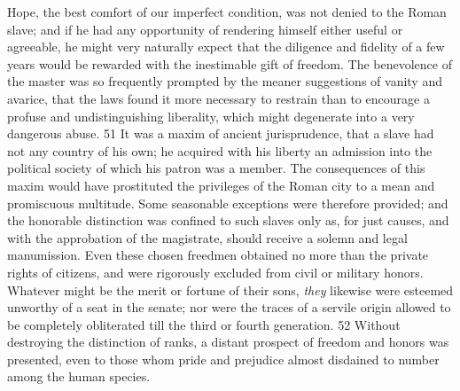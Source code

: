 Hope, the best comfort of our imperfect condition, was not denied
to the Roman slave; and if he had any opportunity of rendering
himself either useful or agreeable, he might very naturally
expect that the diligence and fidelity of a few years would be
rewarded with the inestimable gift of freedom. The benevolence of
the master was so frequently prompted by the meaner suggestions
of vanity and avarice, that the laws found it more necessary to
restrain than to encourage a profuse and undistinguishing
liberality, which might degenerate into a very dangerous abuse.
51 It was a maxim of ancient jurisprudence, that a slave had not
any country of his own; he acquired with his liberty an admission
into the political society of which his patron was a member. The
consequences of this maxim would have prostituted the privileges
of the Roman city to a mean and promiscuous multitude. Some
seasonable exceptions were therefore provided; and the honorable
distinction was confined to such slaves only as, for just causes,
and with the approbation of the magistrate, should receive a
solemn and legal manumission. Even these chosen freedmen obtained
no more than the private rights of citizens, and were rigorously
excluded from civil or military honors. Whatever might be the
merit or fortune of their sons, \textit{they} likewise were esteemed
unworthy of a seat in the senate; nor were the traces of a
servile origin allowed to be completely obliterated till the
third or fourth generation. 52 Without destroying the distinction
of ranks, a distant prospect of freedom and honors was presented,
even to those whom pride and prejudice almost disdained to number
among the human species.


